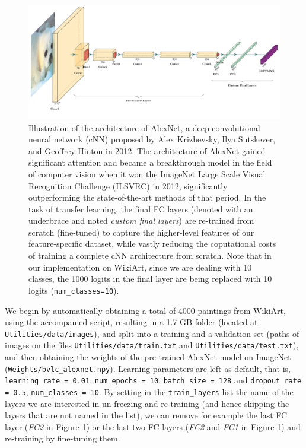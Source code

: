 \documentclass{article}
\def\code#1{\texttt{#1}}
\begin{document}
	\begin{figure}		
	\includegraphics[width=1.0\textwidth]{images/alexnet.pdf}	
	\caption{Illustration of the architecture of AlexNet, a deep convolutional neural network (cNN) proposed by Alex Krizhevsky, Ilya Sutskever, and Geoffrey Hinton in 2012. The architecture of AlexNet gained significant attention and became a breakthrough model in the field of computer vision when it won the ImageNet Large Scale Visual Recognition Challenge (ILSVRC) in 2012, significantly outperforming the state-of-the-art methods of that period. In the task of transfer learning, the final FC layers (denoted with an underbrace and noted \textit{custom final layers}) are re-trained from scratch (fine-tuned) to capture the higher-level features of our feature-specific dataset, while vastly reducing the coputational costs of training a complete cNN architecture from scratch. Note that in our implementation on WikiArt, since we are dealing with 10 classes, the 1000 logits in the final layer are being replaced with 10 logits (\code{num\_classes=10}).}
	\label{fig:alexnet}
	\end{figure}
	
	We begin by automatically obtaining a total of 4000 paintings from WikiArt, using the accompanied script, resulting in a 1.7 GB folder (located at \code{Utilities/data/images}), and split into a training and a validation set (paths of images on the files \code{Utilities/data/train.txt} and \code{Utilities/data/test.txt}), and then obtaining the weights of the pre-trained AlexNet model on ImageNet (\code{Weights/bvlc\_alexnet.npy}). Learning parameters are left as default, that is, \code{learning\_rate = 0.01}, \code{num\_epochs = 10}, \code{batch\_size = 128} and \code{dropout\_rate = 0.5}, \code{num\_classes = 10}. By setting in the \code{train\_layers} list the name of the layers we are interested in un-freezing and re-training (and hence skipping the layers that are not named in the list), we can remove for example the last FC layer (\textit{FC2} in Figure \ref{fig:alexnet}) or the last two FC layers (\textit{FC2} and \textit{FC1} in Figure \ref{fig:alexnet}) and re-training by fine-tuning them. \\
	
\end{document}
